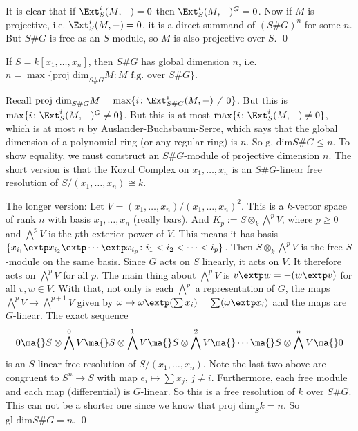 It is clear that if $\Ext_S^i(M,-)=0$ then $\Ext_S^i(M,-)^G=0$. Now if $M$ is projective, i.e. $\Ext_S^i(M,-)=0$, it is a direct summand of $(S\#G)^n$ for some $n$. But $S\#G$ is free as an $S$-module, so $M$ is also projective over $S$. \qed \\


\begin{cor}
If $S= k[x_1,\ldots,x_n]$, then $S\#G$ has global dimension $n$, i.e. $n= \max\{ \text{proj dim}_{S\#G} M \colon M \text{ f.g. over } S\#G\}$. 
\end{cor}

\pf Recall $\text{proj dim}_{S\#G} M= \max\{ i \colon \Ext_{S\#G}^i(M,-) \neq 0 \}$. But this is $\max \{ i \colon \Ext_S^i(M,-)^G \neq 0 \}$. But this is at most $\max \{ i \colon \Ext_S^i(M,-) \neq 0\}$, which is at most $n$ by Auslander-Buchsbaum-Serre, which says that the global dimension of a polynomial ring (or any regular ring) is $n$. So $\text{g, dim} S\#G \leq n$. To show equality, we must construct an $S\#G$-module of projective dimension $n$. The short version is that the Kozul Complex on $x_1,\ldots,x_n$ is an $S\#G$-linear free resolution of $S/(x_1,\ldots,x_n) \cong k$. 


The longer version: Let $V= (x_1,\ldots,x_n)/(x_1,\ldots,x_n)^2$. This is a $k$-vector space of rank $n$ with basis $x_1,\ldots,x_n$ (really bars). And $K_p:= S \otimes_k \bigwedge^p V$, where $p \geq 0$ and $\bigwedge^p V$ is the $p$th exterior power of $V$. This means it has basis $\{ x_{i_1} \extp x_{i_2} \extp \cdots \extp x_{i_p} \colon i_1<i_2<\cdots<i_p\}$. Then $S \otimes_k \bigwedge^p V$ is the free $S$-module on the same basis. Since $G$ acts on $S$ linearly, it acts on $V$. It therefore acts on $\bigwedge^p V$ for all $p$. The main thing about $\bigwedge^p V$ is $v \extp w= -(w \extp v)$ for all $v,w \in V$. With that, not only is each $\bigwedge^p$ a representation of $G$, the maps $\bigwedge^p V \to \bigwedge^{p+1} V$ given by $\omega \mapsto \omega \extp (\sum x_i)= \sum (\omega \extp x_i)$ and the maps are $G$-linear. The exact sequence 
	\[
	0 \ma{} S \otimes \bigwedge^0 V \ma{} S \otimes \bigwedge^1 V \ma{} S \otimes \bigwedge^2 V \ma{} \cdots \ma{} S \otimes \bigwedge^n V \ma{} 0
	\]
is an $S$-linear free resolution of $S/(x_1,\ldots,x_n)$. Note the last two above are congruent to $S^n \to S$ with map $e_i \mapsto \sum x_j$, $j \neq i$. Furthermore, each free module and each map (differential) is $G$-linear. So this is a free resolution of $k$ over $S\#G$. This can not be a shorter one since we know that $\text{proj dim}_S k= n$. So $\text{gl dim} S\#G= n$. \qed \\


